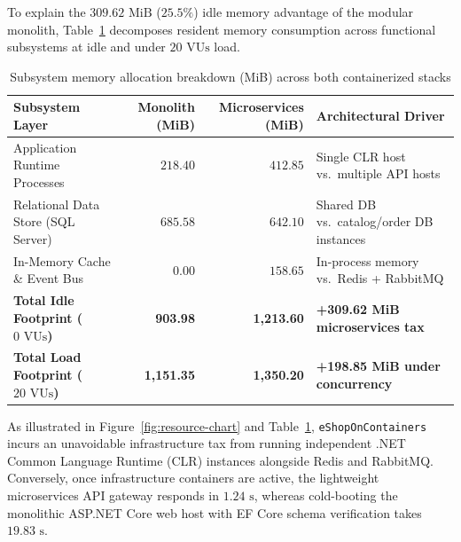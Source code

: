 To explain the $309.62\text{ MiB}$ ($25.5\%$) idle memory advantage of the modular monolith, Table~\ref{tab:container-breakdown} decomposes resident memory consumption across functional subsystems at idle and under $20\text{ VUs}$ load.

\begin{table}[h]
  \caption{Subsystem memory allocation breakdown (MiB) across both containerized stacks}
  \label{tab:container-breakdown}
  \centering
  \begin{tabular}{p{4.8cm}rrp{4.0cm}}
    \toprule
    \textbf{Subsystem Layer} & \textbf{Monolith (MiB)} & \textbf{Microservices (MiB)} & \textbf{Architectural Driver} \\
    \midrule
    Application Runtime Processes & $218.40$ & $412.85$ & Single CLR host vs.\ multiple API hosts \\
    Relational Data Store (SQL Server) & $685.58$ & $642.10$ & Shared DB vs.\ catalog/order DB instances \\
    In-Memory Cache \& Event Bus & $0.00$ & $158.65$ & In-process memory vs.\ Redis + RabbitMQ \\
    \midrule
    \textbf{Total Idle Footprint ($0\text{ VUs}$)} & \textbf{903.98} & \textbf{1,213.60} & \textbf{+309.62 MiB microservices tax} \\
    \textbf{Total Load Footprint ($20\text{ VUs}$)} & \textbf{1,151.35} & \textbf{1,350.20} & \textbf{+198.85 MiB under concurrency} \\
    \bottomrule
  \end{tabular}
\end{table}

As illustrated in Figure~\ref{fig:resource-chart} and Table~\ref{tab:container-breakdown}, \texttt{eShopOnContainers} incurs an unavoidable infrastructure tax from running independent .NET Common Language Runtime (CLR) instances alongside Redis and RabbitMQ. Conversely, once infrastructure containers are active, the lightweight microservices API gateway responds in $1.24\text{ s}$, whereas cold-booting the monolithic ASP.NET Core web host with EF Core schema verification takes $19.83\text{ s}$.

